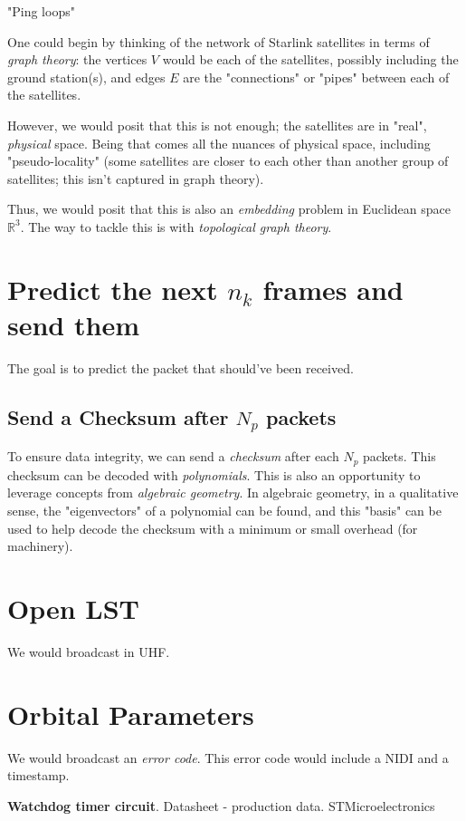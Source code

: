 \documentclass[10pt]{amsart}
\begin{document}
"Ping loops"

One could begin by thinking of the network of Starlink satellites in terms of \emph{graph theory}: the vertices $V$ would be each of the satellites, possibly including the ground station(s), and edges $E$ are the "connections" or "pipes" between each of the satellites.

However, we would posit that this is not enough; the satellites are in "real", \emph{physical} space. Being that comes all the nuances of physical space, including "pseudo-locality" (some satellites are closer to each other than another group of satellites; this isn't captured in graph theory). 

Thus, we would posit that this is also an \emph{embedding} problem in Euclidean space $\mathbb{R}^3$. The way to tackle this is with \emph{topological graph theory}. 

\section{Predict the next $n_k$ frames and send them}

The goal is to predict the packet that should've been received.

\subsection{Send a Checksum after $N_p$ packets}

To ensure data integrity, we can send a \emph{checksum} after each $N_p$ packets. This checksum can be decoded with \emph{polynomials}. This is also an opportunity to leverage concepts from \emph{algebraic geometry}. In algebraic geometry, in a qualitative sense, the "eigenvectors" of a polynomial can be found, and this "basis" can be used to help decode the checksum with a minimum or small overhead (for machinery).

\section{Open LST}

We would broadcast in UHF.

\section{Orbital Parameters}

We would broadcast an \emph{error code}. This error code would include a NIDI and a timestamp.


\begin{thebibliography}{9}

\textbf{Watchdog timer circuit}. Datasheet - production data. STMicroelectronics



\end{thebibliography}
\end{document}
